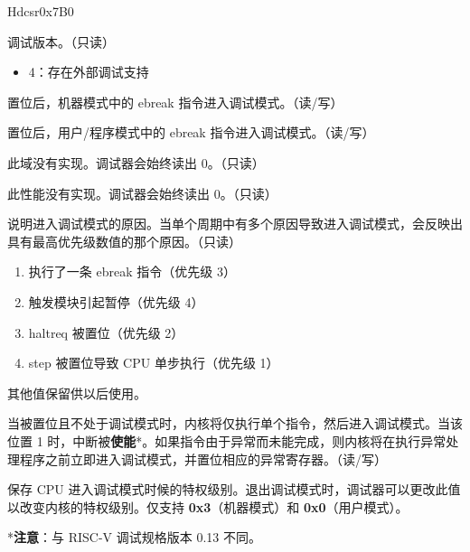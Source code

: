 
\begin{register}{H}{dcsr}{0x7B0}
\label{regdesc:DCSR}
%
%
%
%
%
%
%
%
%
%
%
%
\regnewline%
\begin{regdesc}
\begin{reglist}
\label{fielddesc:DCSRXEDBGVER}\item [xdebugver] 调试版本。（只读）
\begin{itemize}
    \setlength\itemsep{-1em}
    \item 4：存在外部调试支持
\end{itemize}
\label{fielddesc:DCSREBREAKM}\item [ebreakm] 置位后，机器模式中的 ebreak 指令进入调试模式。（读/写）
\label{fielddesc:DCSREBREAKU}\item [ebreaku] 置位后，用户/程序模式中的 ebreak 指令进入调试模式。（读/写）
\label{fielddesc:DCSRSTOPCOUNT}\item [stopcount] 此域没有实现。调试器会始终读出 0。（只读）
\label{fielddesc:DCSRSTOPTIME}\item [stoptime] 此性能没有实现。调试器会始终读出 0。（只读）
\label{fielddesc:DCSRCAUSE}\item [cause] 说明进入调试模式的原因。当单个周期中有多个原因导致进入调试模式，会反映出具有最高优先级数值的那个原因。（只读）
\begin{enumerate}
    \setlength\itemsep{-1em}
    \item 执行了一条 ebreak 指令（优先级 3）
    \item 触发模块引起暂停（优先级 4）
    \item haltreq 被置位（优先级 2）
    \item step 被置位导致 CPU 单步执行（优先级 1）
\end{enumerate}
其他值保留供以后使用。
\label{fielddesc:DCSRSTEP}\item [step] 当被置位且不处于调试模式时，内核将仅执行单个指令，然后进入调试模式。当该位置 1 时，中断被\textbf{使能}*。如果指令由于异常而未能完成，则内核将在执行异常处理程序之前立即进入调试模式，并置位相应的异常寄存器。（读/写）
\label{fielddesc:DCSRPRV}\item [prv] 保存 CPU 进入调试模式时候的特权级别。退出调试模式时，调试器可以更改此值以改变内核的特权级别。仅支持 \textbf{0x3}（机器模式）和 \textbf{0x0}（用户模式）。
\end{reglist}
\end{regdesc}
\end{register}
*\textbf{注意}：与 RISC-V 调试规格版本 0.13 不同。

